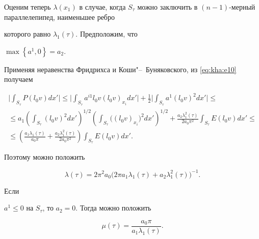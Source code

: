 \newpage



Оценим теперь $\lambda(x_1)$ в случае, когда $S_\tau$ можно заключить в $(n-1)$-мерный параллелепипед, наименьшее ребро

которого равно $\lambda_{1}(\tau).$ Предположим, что

$

\max\left\{{a^1}, 0\right\}=a_2.

$

Применяя неравенства Фридрихса и Коши"--~Буняковского, из \eqref{eq:kha:e10} получаем

\begin{multline*}

\biggl| \int _{S_\tau}P(l_0v)dx' \biggr|\leqslant\biggl|\int _{S_\tau}a^{i1}l_0v(l_0v)_{x_i}

dx' \biggr|+\frac{1}{2}\biggl| \int _{S_\tau}{a^1(l_0v)^2}dx' \biggr|\leqslant

\\

\leqslant a_1 \left(\int _{S_\tau}(l_0v)^2dx'\right)^{1/2}

\left(\int _{S_\tau}\bigl((l_0v)_{x_i}\bigr)^2dx'\right)^{1/2}+\frac{a_2\lambda_1^2{(\tau)}}{2a_0 \pi^2}

\int _{S_\tau}E(l_0v)dx'\leqslant

\\

\leqslant\left(\frac{a_1\lambda_1{(\tau)}}{a_0\pi}+

\frac{a_2\lambda_1^2(\tau)}{2a_0\pi^2}\right)\int _{S_\tau}E(l_0v)dx'.

\end{multline*}

Поэтому можно положить

\begin{equation}\label{eq:kha:e13}

\lambda(\tau)=2\pi^2 a_0 \bigl(2\pi

a_1\lambda_1(\tau)+a_2\lambda_1^2(\tau)\bigr)^{-1}.

\end{equation}

Если

$a^1\leqslant 0$ на $S_\tau$, то $a_2=0.$ Тогда можно положить

\begin{equation}\label{eq:kha:e14}

\mu(\tau)=\frac{a_0\pi}{a_1\lambda_1(\tau)}.

\end{equation}




